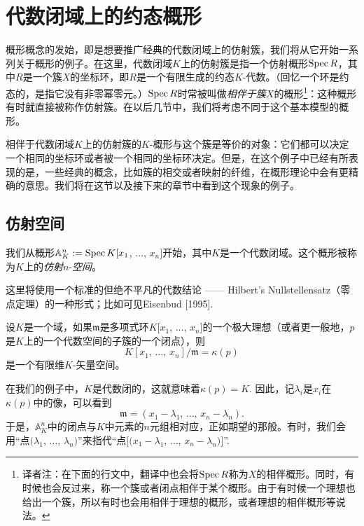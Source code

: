 \section{代数闭域上的约态概形}

概形概念的发始，即是想要推广经典的代数闭域上的仿射簇，我们将从它开始一系列关于概形的例子。在这里，代数闭域$K$上的仿射簇是指一个仿射概形$\operatorname{Spec} R$，其中$R$是一个簇$X$的坐标环，即$R$是一个有限生成的约态$K$\hyp 代数。（回忆一个环是约态的，是指它没有非零幂零元。）$\operatorname{Spec} R$时常被叫做\textit{相伴于簇}$X$的概形\footnote{译者注：在下面的行文中，翻译中也会将$\operatorname{Spec} R$称为$X$的相伴概形。同时，有时候也会反过来，称一个簇或者闭点相伴于某个概形。由于有时候一个理想也给出一个簇，所以有时也会用相伴于理想的概形，或者理想的相伴概形等说法。}：这种概形有时就直接被称作仿射簇。在以后几节中，我们将考虑不同于这个基本模型的概形。

相伴于代数闭域$K$上的仿射簇的$K$\hyp 概形与这个簇是等价的对象：它们都可以决定一个相同的坐标环或者被一个相同的坐标环决定。但是，在这个例子中已经有所表现的是，一些经典的概念，比如簇的相交或者映射的纤维，在概形理论中会有更精确的意思。我们将在这节以及接下来的章节中看到这个现象的例子。

\subsection{仿射空间}

我们从概形$\mathbb{A}^n_K:=\operatorname{Spec} K[x_1$, $\dots$, $x_n]$开始，其中$K$是一个代数闭域。这个概形被称为$K$上的\textit{仿射}$n$-\textit{空间}。

这里将使用一个标准的但绝不平凡的代数结论 ------ Hilbert's Nullstellensatz（零点定理）的一种形式；比如可见Eisenbud [1995].

\begin{thm}[Nullstellensatz]
	设$K$是一个域，如果$\mathfrak{m}$是多项式环$K[x_1$, $\dots$, $x_n]$的一个极大理想（或者更一般地，$p$是$K$上的一个代数空间的子簇的一个闭点），则
	\[
		K[\text{$x_1$, $\dots$, $x_n$}]/\mathfrak{m}=\kappa(p)
	\]
	是一个有限维$K$\hyp 矢量空间。
\end{thm}

在我们的例子中，$K$是代数闭的，这就意味着$\kappa(p)=K$. 因此，记$\lambda_i$是$x_i$在$\kappa(p)$中的像，可以看到
\[
	\mathfrak{m}=(\text{$x_1-\lambda_1$, $\dots$, $x_n-\lambda_n$}).
\]
于是，$\mathbb{A}^n_K$中的闭点与$K$中元素的$n$元组相对应，正如期望的那般。有时，我们会用“点$(\lambda_1$, $\dots$, $\lambda_n)$”来指代“点$[(x_1-\lambda_1$, $\dots$, $x_n-\lambda_n)]$”. 

